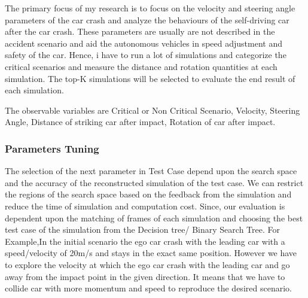 The primary focus of my research is to focus on the velocity and steering angle parameters of the car crash and analyze the behaviours of the self-driving car after the car crash. These parameters are usually are not described in the accident scenario and aid the autonomous vehicles in speed adjustment and safety of the car. Hence, i have to run a lot of simulations and categorize the critical scenarios and measure the distance and rotation quantities at each simulation. The top-K simulations will be selected to evaluate the end result of each simulation. 

The observable variables are Critical or Non Critical Scenario, Velocity,	Steering Angle,	Distance of striking car after impact, Rotation of car after impact.


\subsubsection{Parameters Tuning}
The selection of the next parameter in Test Case depend upon the search space and the accuracy of the reconstructed simulation of the test case. We can restrict the regions of the search space based on the feedback from the simulation and reduce the time of simulation and computation cost. Since, our evaluation is dependent upon the matching of frames of each simulation and choosing the best test case of the simulation from the Decision tree/ Binary Search Tree. For Example,In the initial scenario the ego car crash with the leading car with a speed/velocity of 20m/s and stays in the exact same position. However we have to explore the velocity at which the ego car crash with the leading car and go away from the impact point in the given direction. It means that we have to collide car with more momentum and speed to reproduce the desired scenario.